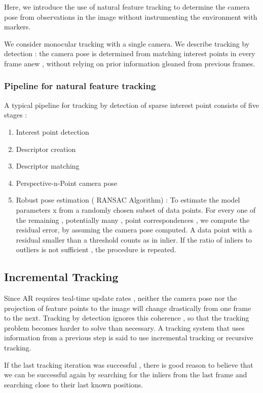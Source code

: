 \documentclass{article}
\begin{document}
Here, we introduce the use of natural feature tracking to determine the camera pose from observations in the image without instrumenting the environment with markers.

We consider monocular tracking with a single camera. We describe tracking by detection : the camera pose is determined from matching interest points in every frame anew , without relying on prior information gleaned from previous frames.

\subsubsection{Pipeline for natural feature tracking}

A typical pipeline for tracking by detection of sparse interest point consists of five stages :

\begin{enumerate}
    \item Interest point detection
    \item Descriptor creation
    \item Descriptor matching
    \item Perspective-n-Point camera pose
    \item Robust pose estimation ( RANSAC Algorithm) : To estimate the model parameters x from a randomly chosen subset of data points. For every one of the remaining , potentially many , point correspondences , we compute the residual error, by assuming the camera pose computed. A data point with a residual smaller than a threshold counts as in inlier. If the ratio of inliers to outliers is not sufficient , the procedure is repeated.
\end{enumerate}

\subsection{Incremental Tracking}
Since AR requires teal-time update rates , neither the camera pose nor the projection of feature points to the image will change drastically from one frame to the next.
Tracking by detection ignores this coherence , so that the tracking problem becomes harder to solve than necessary.
A tracking system that uses information from  a previous step is said to use incremental tracking or recursive tracking.

If the last tracking iteration was successful , there is good reason to believe that we can be successful again by searching for the inliers from the last frame and searching close to their last known positions.
\end{document}
